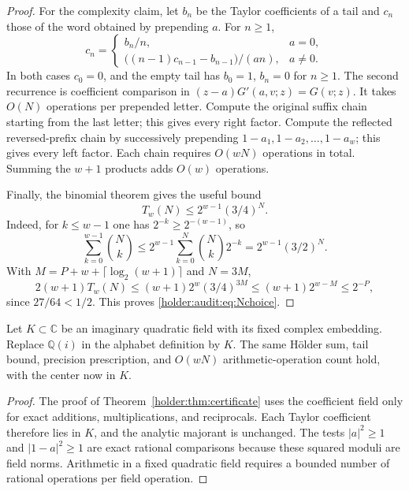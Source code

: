 \begin{proof}
For the complexity claim, let $b_n$ be the Taylor coefficients of a
tail and $c_n$ those of the word obtained by prepending $a$. For $n\geq1$,
\begin{equation}\label{holder:audit:eq:recurrence}
 c_n=
 \begin{cases}
   b_n/n,&a=0,\\
   \bigl((n-1)c_{n-1}-b_{n-1}\bigr)/(an),&a\ne0.
 \end{cases}
\end{equation}
In both cases $c_0=0$, and the empty tail has $b_0=1$, $b_n=0$ for
$n\geq1$. The second recurrence is coefficient comparison in
$(z-a)G'(a,v;z)=G(v;z)$.
It takes $O(N)$ operations per prepended letter. Compute the original
suffix chain starting from the last letter; this gives every right
factor. Compute the reflected reversed-prefix chain by successively
prepending $1-a_1,1-a_2,\ldots,1-a_w$; this gives every left factor.
Each chain requires $O(wN)$ operations in total. Summing the $w+1$
products adds $O(w)$ operations.

Finally, the binomial theorem gives the useful bound
\[
 T_w(N)\leq 2^{w-1}(3/4)^N.
\]
Indeed, for $k\leq w-1$ one has $2^{-k}\geq2^{-(w-1)}$, so
\[
 \sum_{k=0}^{w-1}\binom Nk
 \leq2^{w-1}\sum_{k=0}^N\binom Nk2^{-k}
 =2^{w-1}(3/2)^N.
\]
With $M=P+w+\lceil\log_2(w+1)\rceil$ and $N=3M$,
\[
 2(w+1)T_w(N)
 \leq(w+1)2^w(3/4)^{3M}
 \leq(w+1)2^{w-M}\leq2^{-P},
\]
since $27/64<1/2$. This proves \eqref{holder:audit:eq:Nchoice}.
\end{proof}

\begin{corollary}
\label{holder:cor:quadratic-certificate}
Let $K\subset\mathbb C$ be an imaginary quadratic field with its fixed
complex embedding. Replace $\mathbb Q(i)$ in the alphabet definition by
$K$. The same H\"older sum, tail bound, precision prescription, and
$O(wN)$ arithmetic-operation count hold, with the center now in $K$.
\end{corollary}
\begin{proof}
The proof of Theorem~\ref{holder:thm:certificate} uses the coefficient field
only for exact additions, multiplications, and reciprocals. Each
Taylor coefficient therefore lies in $K$, and the analytic majorant
is unchanged. The tests $|a|^2\ge1$ and $|1-a|^2\ge1$ are exact
rational comparisons because these squared moduli are field norms.
Arithmetic in a fixed quadratic field requires a bounded number of
rational operations per field operation.
\end{proof}

